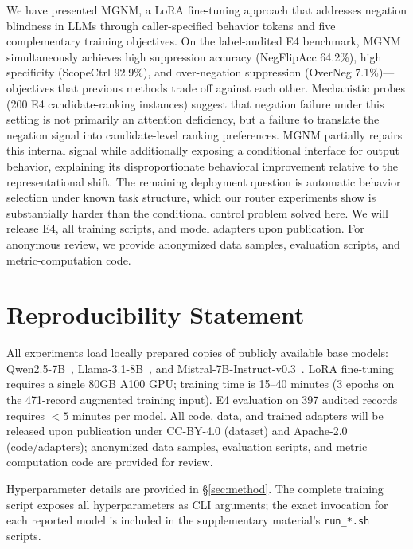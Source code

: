 \documentclass[letterpaper]{article}
\begin{document}
We have presented MGNM, a LoRA fine-tuning approach that addresses negation
blindness in LLMs through caller-specified behavior tokens and five
complementary training objectives.
On the label-audited E4 benchmark, MGNM simultaneously achieves high suppression
accuracy (NegFlipAcc 64.2\%), high specificity (ScopeCtrl 92.9\%), and
over-negation suppression (OverNeg 7.1\%)---objectives that previous methods trade off
against each other.
Mechanistic probes (200 E4 candidate-ranking instances) suggest that negation
failure under this setting is not primarily an attention deficiency, but a failure
to translate the negation signal into candidate-level ranking preferences.
MGNM partially repairs this internal signal while additionally exposing
a conditional interface for output behavior, explaining its disproportionate
behavioral improvement relative to the representational shift.
The remaining deployment question is automatic behavior selection under known
task structure, which our router experiments show is substantially harder than
the conditional control problem solved here.
We will release E4, all training scripts, and model adapters upon publication.
For anonymous review, we provide anonymized data samples, evaluation scripts,
and metric-computation code.



\appendix

\section{Reproducibility Statement}

All experiments load locally prepared copies of publicly available base models:
Qwen2.5-7B~\cite{qwen2025qwen25},
Llama-3.1-8B~\cite{dubey2024llama},
and Mistral-7B-Instruct-v0.3~\cite{jiang2023mistral}.
LoRA fine-tuning requires a single 80GB A100 GPU; training time is 15--40 minutes
(3 epochs on the 471-record augmented training input).
E4 evaluation on 397 audited records requires $<5$ minutes per model.
All code, data, and trained adapters will be released upon publication under
CC-BY-4.0 (dataset) and Apache-2.0 (code/adapters); anonymized data samples,
evaluation scripts, and metric computation code are provided for review.

Hyperparameter details are provided in \S\ref{sec:method}.
The complete training script exposes all hyperparameters as CLI arguments;
the exact invocation for each reported model is included in the supplementary
material's \texttt{run\_*.sh} scripts.
\end{document}
